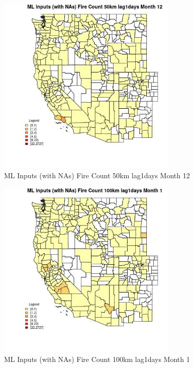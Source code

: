 \begin{figure} 
\centering  
\includegraphics[width=0.77\textwidth]{Code_Outputs/Report_ML_input_PM25_Step4_part_f_de_duplicated_aveswNAs_CountyFire_Count_50km_lag1daysmedianMonth12.jpg} 
\caption{\label{fig:Report_ML_input_PM25_Step4_part_f_de_duplicated_aveswNAsCountyFire_Count_50km_lag1daysmedianMonth12}ML Inputs (with NAs) Fire Count 50km lag1days Month 12} 
\end{figure} 
 

\begin{figure} 
\centering  
\includegraphics[width=0.77\textwidth]{Code_Outputs/Report_ML_input_PM25_Step4_part_f_de_duplicated_aveswNAs_CountyFire_Count_100km_lag1daysmedianMonth1.jpg} 
\caption{\label{fig:Report_ML_input_PM25_Step4_part_f_de_duplicated_aveswNAsCountyFire_Count_100km_lag1daysmedianMonth1}ML Inputs (with NAs) Fire Count 100km lag1days Month 1} 
\end{figure} 
 

